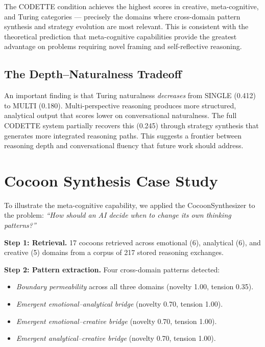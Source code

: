 \documentclass[11pt,a4paper]{article}
\begin{document}
The CODETTE condition achieves the highest scores in creative, meta-cognitive, and Turing categories --- precisely the domains where cross-domain pattern synthesis and strategy evolution are most relevant. This is consistent with the theoretical prediction that meta-cognitive capabilities provide the greatest advantage on problems requiring novel framing and self-reflective reasoning.

\subsection{The Depth--Naturalness Tradeoff}

An important finding is that Turing naturalness \emph{decreases} from SINGLE (0.412) to MULTI (0.180). Multi-perspective reasoning produces more structured, analytical output that scores lower on conversational naturalness. The full CODETTE system partially recovers this (0.245) through strategy synthesis that generates more integrated reasoning paths. This suggests a frontier between reasoning depth and conversational fluency that future work should address.

\section{Cocoon Synthesis Case Study}
\label{sec:casestudy}

To illustrate the meta-cognitive capability, we applied the CocoonSynthesizer to the problem: \emph{``How should an AI decide when to change its own thinking patterns?''}

\textbf{Step 1: Retrieval.} 17 cocoons retrieved across emotional (6), analytical (6), and creative (5) domains from a corpus of 217 stored reasoning exchanges.

\textbf{Step 2: Pattern extraction.} Four cross-domain patterns detected:
\begin{itemize}[nosep]
  \item \emph{Boundary permeability} across all three domains (novelty 1.00, tension 0.35).
  \item \emph{Emergent emotional--analytical bridge} (novelty 0.70, tension 1.00).
  \item \emph{Emergent emotional--creative bridge} (novelty 0.70, tension 1.00).
  \item \emph{Emergent analytical--creative bridge} (novelty 0.70, tension 1.00).
\end{itemize}
\end{document}
